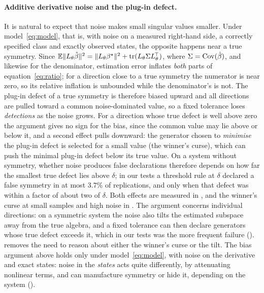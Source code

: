 \paragraph{Additive derivative noise and the plug-in defect.} It is natural
to expect that noise makes small singular values smaller. Under
model~\eqref{eq:model}, that is, with noise on a measured right-hand side, a
correctly specified class and exactly observed states, the opposite happens
near a true symmetry. Since $\mathbb{E}\|L_\theta \hat{\beta}\|^2 = \|L_\theta\beta^\star\|^2 +
\mathrm{tr}(L_\theta \Sigma L_\theta^{\!\top})$, where $\Sigma =
\mathrm{Cov}(\hat{\beta})$, and likewise for the denominator, estimation error
inflates \emph{both} parts of equation~\eqref{eq:ratio}; for a direction close
to a true symmetry the numerator is near zero, so its relative inflation is
unbounded while the denominator's is not. The plug-in defect of a true
symmetry is therefore biased upward and all directions are pulled toward a
common noise-dominated value, so a fixed tolerance loses \emph{detections} as
the noise grows. For a direction whose true defect is well above zero the
argument gives no sign for the bias, since the common value may lie above or
below it, and a second effect pulls downward: the generator chosen to
\emph{minimise} the plug-in defect is selected for a small value (the
winner's curse), which can push the minimal plug-in defect below its true
value. On a system without symmetry, whether noise produces false
declarations therefore depends on how far the smallest true defect lies
above $\delta$; in our tests a threshold rule at $\delta$ declared a false
symmetry in at most $3.7\%$ of replications, and only when that defect was
within a factor of about two of $\delta$. Both effects are measured in
, and the winner's curse at small samples and high noise
in . The argument concerns individual directions: on a
symmetric system the noise also tilts the estimated subspace away from the
true algebra, and a fixed tolerance can then declare generators whose true
defect exceeds it, which in our tests was the more frequent failure
().  removes the need to reason
about either the winner's curse or the tilt. The bias argument above holds
only under model~\eqref{eq:model}, with noise on the derivative and exact
states: noise in the \emph{states} acts quite differently, by attenuating
nonlinear terms, and can manufacture symmetry or hide it, depending on the
system ().
